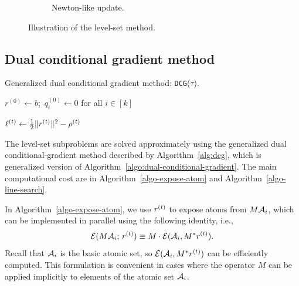 \begin{figure}[t]
\begin{subfigure}{.48\textwidth}
      \captionsetup{justification=centering}
      \caption{Newton-like update.}
    \end{subfigure}
    \captionsetup{justification=centering}
    \caption{Illustration of the level-set method.}
    \label{fig:value_fn}
\end{figure}

\subsection{Dual conditional gradient method} \label{sec:dcg}

\begin{algorithm}[t]
  \DontPrintSemicolon
  \setcounter{AlgoLine}{0}
  \caption{Generalized dual conditional gradient method: \texttt{DCG}($\tau$). \label{alg:dcg}}
  \KwIn{$\tau$}

  $r^{(0)} \gets b$;\ $q_i^{(0)} \gets 0$ for all $i\in[k]$\;

  $\ell^{(t)}\gets{\textstyle{\frac{1}{2}}}\|r^{(t)}\|^2-\rho^{(t)}$

\end{algorithm}

The level-set subproblems are solved approximately using the generalized dual conditional-gradient method described by Algorithm~\ref{alg:dcg}, which is generalized version of Algorithm~\ref{algo:dual-conditional-gradient}. The main computational cost are in Algorithm~\ref{algo-expose-atom} and Algorithm~\ref{algo-line-search}. 

In Algorithm~\ref{algo-expose-atom}, we use $r^{(t)}$ to expose atoms from $M\mathcal{A}_i$, which can be implemented in parallel using the following identity, i.e.,
\begin{equation*}
  \mathcal{E}(M\mathcal{A}_i;\,r^{(t)}) \equiv M\cdot\mathcal{E}(\mathcal{A}_i, M^*r^{(t)}).
\end{equation*}
Recall that $\mathcal{A}_i$ is the basic atomic set, so $\mathcal{E}(\mathcal{A}_i, M^*r^{(t)})$ can be efficiently computed. This formulation is convenient in cases where the operator $M$ can be applied implicitly to elements of the atomic set $\mathcal{A}_i$. 

